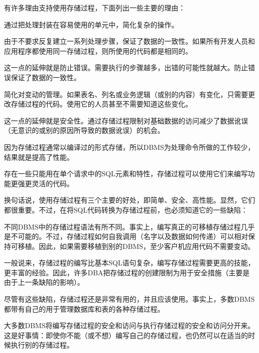 有许多理由支持使用存储过程，下面列出一些主要的理由：

\begin{compactitem}
\item 通过把处理封装在容易使用的单元中，简化复杂的操作。
\item 由于不要求反复建立一系列处理步骤，保证了数据的一致性。如果所有开发人员和应用程序都使用同一存储过程，则所使用的代码都是相同的。
\end{compactitem}

这一点的延伸就是防止错误。需要执行的步骤越多，出错的可能性就越大。防止错误保证了数据的一致性。

\begin{compactitem}
\item 简化对变动的管理。如果表名、列名或业务逻辑（或别的内容）有变化，只需要更改存储过程的代码。使用它的人员甚至不需要知道这些变化。
\item 这一点的延伸就是安全性。通过存储过程限制对基础数据的访问减少了数据讹误（无意识的或别的原因所导致的数据讹误）的机会。
\item 因为存储过程通常以编译过的形式存储，所以DBMS为处理命令所做的工作较少，结果就是提高了性能。
\item 存在一些只能用在单个请求中的SQL元素和特性，存储过程可以使用它们来编写功能更强更灵活的代码。
\end{compactitem}

换句话说，使用存储过程有三个主要的好处，即简单、安全、高性能。显然，它们都很重要。不过，在将SQL代码转换为存储过程前，也必须知道它的一些缺陷：

\begin{compactitem}
\item 不同DBMS中的存储过程语法有所不同。事实上，编写真正的可移植存储过程几乎是不可能的。不过，存储过程如何自我调用（名字以及数据如何传递）可以相对保持可移植。因此，如果需要移植到别的DBMS，至少客户机应用代码不需要变动。
\item 一般说来，存储过程的编写比基本SQL语句复杂，编写存储过程需要更高的技能，更丰富的经验。因此，许多DBA把存储过程的创建限制为用于安全措施（主要是由于上一条缺陷的影响）。
\end{compactitem}

尽管有这些缺陷，存储过程还是非常有用的，并且应该使用。事实上，多数DBMS都带有自己的用于管理数据库和表的各种存储过程。

大多数DBMS将编写存储过程的安全和访问与执行存储过程的安全和访问分开来。这是好事情：即使你不能（或不想）编写自己的存储过程，也仍然可以在适当的时候执行别的存储过程。


